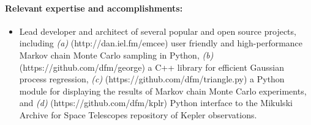 \documentclass[letterpaper,12pt]{article}
\begin{document}
\paragraph{Relevant expertise and accomplishments:}
\begin{itemize}\setlength{\itemsep}{0pt}
\item
Lead developer and architect of several popular and open source projects,
including
\emph{(a)}  (http://dan.iel.fm/emcee) user friendly and
high-performance Markov chain Monte Carlo sampling in Python,
\emph{(b)}  (https://github.com/dfm/george) a C++ library for
efficient Gaussian process regression,
\emph{(c)}  (https://github.com/dfm/triangle.py) a Python
module for displaying the results of Markov chain Monte Carlo experiments, and
\emph{(d)}  (https://github.com/dfm/kplr) Python interface
to the Mikulski Archive for Space Telescopes repository of Kepler observations.
\end{itemize}
\end{document}
